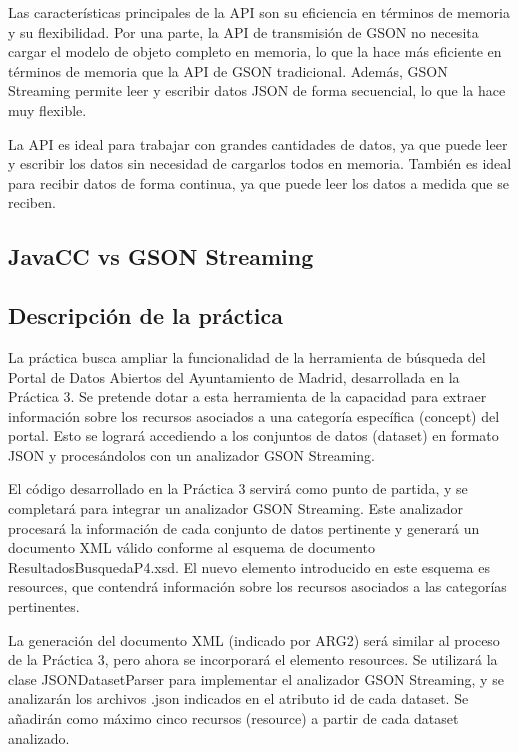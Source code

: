 Las características principales de la API son su eficiencia en términos de memoria y  su flexibilidad. Por una parte, la API de transmisión de GSON no necesita cargar el modelo de objeto completo en memoria, lo que la hace más eficiente en términos de memoria que la API de GSON tradicional. Además, GSON Streaming permite leer y escribir datos JSON de forma secuencial, lo que la hace muy flexible.

La API es ideal para trabajar con grandes cantidades de datos, ya que puede leer y escribir los datos sin necesidad de cargarlos todos en memoria. También es ideal para recibir datos de forma continua, ya que puede leer los datos a medida que se reciben.


\subsection{JavaCC vs GSON Streaming}

\subsection{Descripción de la práctica}

La práctica busca ampliar la funcionalidad de la herramienta de búsqueda del Portal de Datos Abiertos del Ayuntamiento de Madrid, desarrollada en la Práctica 3. Se pretende dotar a esta herramienta de la capacidad para extraer información sobre los recursos asociados a una categoría específica (concept) del portal. Esto se logrará accediendo a los conjuntos de datos (dataset) en formato JSON y procesándolos con un analizador GSON Streaming.

El código desarrollado en la Práctica 3 servirá como punto de partida, y se completará para integrar un analizador GSON Streaming. Este analizador procesará la información de cada conjunto de datos pertinente y generará un documento XML válido conforme al esquema de documento ResultadosBusquedaP4.xsd. El nuevo elemento introducido en este esquema es resources, que contendrá información sobre los recursos asociados a las categorías pertinentes.

La generación del documento XML (indicado por ARG2) será similar al proceso de la Práctica 3, pero ahora se incorporará el elemento resources. Se utilizará la clase JSONDatasetParser para implementar el analizador GSON Streaming, y se analizarán los archivos .json indicados en el atributo id de cada dataset. Se añadirán como máximo cinco recursos (resource) a partir de cada dataset analizado.


